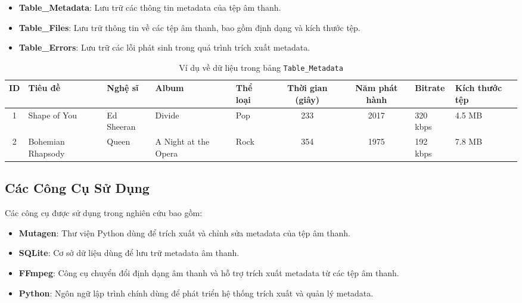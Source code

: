 \documentclass[conference]{IEEEtran}
\begin{document}
\begin{itemize}
    \item \textbf{Table\_Metadata}: Lưu trữ các thông tin metadata của tệp âm thanh.
    \item \textbf{Table\_Files}: Lưu trữ thông tin về các tệp âm thanh, bao gồm định dạng và kích thước tệp.
    \item \textbf{Table\_Errors}: Lưu trữ các lỗi phát sinh trong quá trình trích xuất metadata.
\end{itemize}

\begin{table}[ht]
    \centering
    \begin{minipage}[b]{0.5\textwidth}  %
        \centering
        \begin{tabular}{|c|l|l|l|l|c|c|l|l|}
        \hline
        \textbf{ID} & \textbf{Tiêu đề}         & \textbf{Nghệ sĩ}    & \textbf{Album}               & \textbf{Thể loại} & \textbf{Thời gian (giây)} & \textbf{Năm phát hành} & \textbf{Bitrate} & \textbf{Kích thước tệp} \\ \hline
        1           & Shape of You             & Ed Sheeran          & Divide                      & Pop               & 233                      & 2017                    & 320 kbps          & 4.5 MB                 \\ \hline
        2           & Bohemian Rhapsody        & Queen               & A Night at the Opera        & Rock              & 354                      & 1975                    & 192 kbps          & 7.8 MB                 \\ \hline
        \end{tabular}
        \caption{Ví dụ về dữ liệu trong bảng \texttt{Table\_Metadata}}
        \label{tab:metadata_example}
    \end{minipage}
\end{table}

\subsection{Các Công Cụ Sử Dụng}
Các công cụ được sử dụng trong nghiên cứu bao gồm:

\begin{itemize}
    \item \textbf{Mutagen}: Thư viện Python dùng để trích xuất và chỉnh sửa metadata của tệp âm thanh.
    \item \textbf{SQLite}: Cơ sở dữ liệu dùng để lưu trữ metadata âm thanh.
    \item \textbf{FFmpeg}: Công cụ chuyển đổi định dạng âm thanh và hỗ trợ trích xuất metadata từ các tệp âm thanh.
    \item \textbf{Python}: Ngôn ngữ lập trình chính dùng để phát triển hệ thống trích xuất và quản lý metadata.
\end{itemize}
\end{document}
